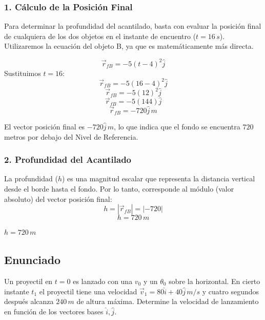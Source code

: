 \documentclass[12pt, a4paper]{article}
\begin{document}
\subsubsection*{1. Cálculo de la Posición Final}
Para determinar la profundidad del acantilado, basta con evaluar la posición final de cualquiera de los dos objetos en el instante de encuentro ($t = 16 \, \si{s}$). Utilizaremos la ecuación del objeto B, ya que es matemáticamente más directa.

$$ \vec{r}_{fB} = -5(t - 4)^2\hat{j} $$
Sustituimos $t = 16$:
$$ \vec{r}_{fB} = -5(16 - 4)^2\hat{j} $$
$$ \vec{r}_{fB} = -5(12)^2\hat{j} $$
$$ \vec{r}_{fB} = -5(144)\hat{j} $$
$$ \vec{r}_{fB} = -720\hat{j} \, \si{m} $$

El vector posición final es $-720\hat{j} \, \si{m}$, lo que indica que el fondo se encuentra $720$ metros por debajo del Nivel de Referencia.

\subsubsection*{2. Profundidad del Acantilado}
La profundidad ($h$) es una magnitud escalar que representa la distancia vertical desde el borde hasta el fondo. Por lo tanto, corresponde al módulo (valor absoluto) del vector posición final:
$$ h = |\vec{r}_{fB}| = |-720| $$
$$ h = 720 \, \si{m} $$

\begin{tcolorbox}[colback=green!5!white, colframe=green!50!black, title=Respuesta b)]
\centering \Large $h = 720 \, \si{m}$
\end{tcolorbox}

\newpage

\subsection*{Enunciado}
Un proyectil en $t = 0$ es lanzado con una $v_0$ y un $\theta_0$ sobre la horizontal. En cierto instante $t_1$ el proyectil tiene una velocidad $\vec{v}_1 = 80\hat{i} + 40\hat{j} \, \si{m/s}$ y cuatro segundos después alcanza $240 \, \si{m}$ de altura máxima. Determine la velocidad de lanzamiento en función de los vectores bases $\hat{i}, \hat{j}$.
\end{document}
